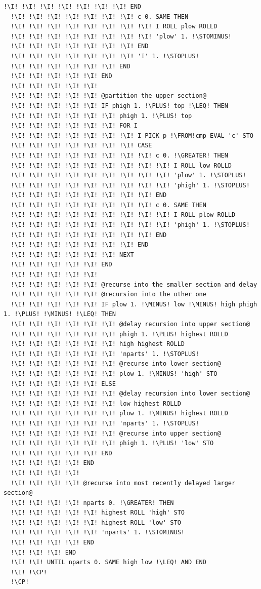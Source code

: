 \documentclass[12pt,a4paper]{report}
\newcommand{\kwd}[1]{\texttt{\textcolor{keyword}{#1}}}
\newcommand{\I}{\enspace\textcolor{indent}\vrule\hspace{2pt}}
\newcommand{\LEQ}{\kwd{$\leq$}}   %
\newcommand{\GREATER}{\kwd{$>$}}   %
\newcommand{\PLUS}{\kwd{+}}   %
\newcommand{\MINUS}{\kwd{-}}   %
\newcommand{\STOPLUS}{\kwd{STO+}} %
\newcommand{\STOMINUS}{\kwd{STO-}} %
\newcommand{\CP}{\kwd{$\gg$}}   %
\newcommand{\FROM}{\kwd{$\leftarrow$}} %
\numberwithin{theorem}{chapter}
\begin{document}
\begin{lstlisting}[language=userrpl]
  !\I! !\I! !\I! !\I! !\I! !\I! !\I! END
  !\I! !\I! !\I! !\I! !\I! !\I! !\I! c 0. SAME THEN
  !\I! !\I! !\I! !\I! !\I! !\I! !\I! !\I! I ROLL plow ROLLD
  !\I! !\I! !\I! !\I! !\I! !\I! !\I! !\I! 'plow' 1. !\STOMINUS!
  !\I! !\I! !\I! !\I! !\I! !\I! !\I! END
  !\I! !\I! !\I! !\I! !\I! !\I! !\I! 'I' 1. !\STOPLUS!
  !\I! !\I! !\I! !\I! !\I! !\I! END
  !\I! !\I! !\I! !\I! !\I! END
  !\I! !\I! !\I! !\I! !\I!
  !\I! !\I! !\I! !\I! !\I! @partition the upper section@
  !\I! !\I! !\I! !\I! !\I! IF phigh 1. !\PLUS! top !\LEQ! THEN
  !\I! !\I! !\I! !\I! !\I! !\I! phigh 1. !\PLUS! top
  !\I! !\I! !\I! !\I! !\I! !\I! FOR I
  !\I! !\I! !\I! !\I! !\I! !\I! !\I! I PICK p !\FROM!cmp EVAL 'c' STO
  !\I! !\I! !\I! !\I! !\I! !\I! !\I! CASE
  !\I! !\I! !\I! !\I! !\I! !\I! !\I! !\I! c 0. !\GREATER! THEN
  !\I! !\I! !\I! !\I! !\I! !\I! !\I! !\I! !\I! I ROLL low ROLLD
  !\I! !\I! !\I! !\I! !\I! !\I! !\I! !\I! !\I! 'plow' 1. !\STOPLUS!
  !\I! !\I! !\I! !\I! !\I! !\I! !\I! !\I! !\I! 'phigh' 1. !\STOPLUS!
  !\I! !\I! !\I! !\I! !\I! !\I! !\I! !\I! END
  !\I! !\I! !\I! !\I! !\I! !\I! !\I! !\I! c 0. SAME THEN
  !\I! !\I! !\I! !\I! !\I! !\I! !\I! !\I! !\I! I ROLL plow ROLLD
  !\I! !\I! !\I! !\I! !\I! !\I! !\I! !\I! !\I! 'phigh' 1. !\STOPLUS!
  !\I! !\I! !\I! !\I! !\I! !\I! !\I! !\I! END
  !\I! !\I! !\I! !\I! !\I! !\I! !\I! END
  !\I! !\I! !\I! !\I! !\I! !\I! NEXT
  !\I! !\I! !\I! !\I! !\I! END
  !\I! !\I! !\I! !\I! !\I!
  !\I! !\I! !\I! !\I! !\I! @recurse into the smaller section and delay
  !\I! !\I! !\I! !\I! !\I! @recursion into the other one
  !\I! !\I! !\I! !\I! !\I! IF plow 1. !\MINUS! low !\MINUS! high phigh 1. !\PLUS! !\MINUS! !\LEQ! THEN
  !\I! !\I! !\I! !\I! !\I! !\I! @delay recursion into upper section@
  !\I! !\I! !\I! !\I! !\I! !\I! phigh 1. !\PLUS! highest ROLLD
  !\I! !\I! !\I! !\I! !\I! !\I! high highest ROLLD
  !\I! !\I! !\I! !\I! !\I! !\I! 'nparts' 1. !\STOPLUS!
  !\I! !\I! !\I! !\I! !\I! !\I! @recurse into lower section@
  !\I! !\I! !\I! !\I! !\I! !\I! plow 1. !\MINUS! 'high' STO
  !\I! !\I! !\I! !\I! !\I! ELSE
  !\I! !\I! !\I! !\I! !\I! !\I! @delay recursion into lower section@
  !\I! !\I! !\I! !\I! !\I! !\I! low highest ROLLD
  !\I! !\I! !\I! !\I! !\I! !\I! plow 1. !\MINUS! highest ROLLD
  !\I! !\I! !\I! !\I! !\I! !\I! 'nparts' 1. !\STOPLUS!
  !\I! !\I! !\I! !\I! !\I! !\I! @recurse into upper section@
  !\I! !\I! !\I! !\I! !\I! !\I! phigh 1. !\PLUS! 'low' STO
  !\I! !\I! !\I! !\I! !\I! END
  !\I! !\I! !\I! !\I! END
  !\I! !\I! !\I! !\I!
  !\I! !\I! !\I! !\I! @recurse into most recently delayed larger section@
  !\I! !\I! !\I! !\I! nparts 0. !\GREATER! THEN
  !\I! !\I! !\I! !\I! !\I! highest ROLL 'high' STO
  !\I! !\I! !\I! !\I! !\I! highest ROLL 'low' STO
  !\I! !\I! !\I! !\I! !\I! 'nparts' 1. !\STOMINUS!
  !\I! !\I! !\I! !\I! END
  !\I! !\I! !\I! END
  !\I! !\I! UNTIL nparts 0. SAME high low !\LEQ! AND END
  !\I! !\CP!
  !\CP!
\end{lstlisting}
\end{document}
